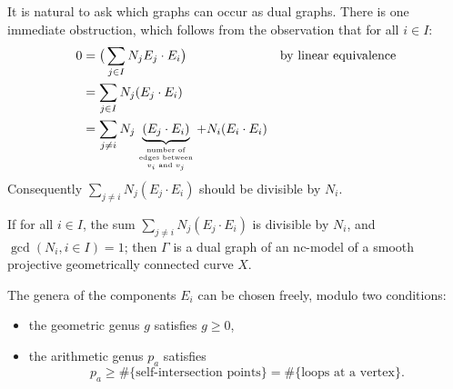 It is natural to ask which graphs can occur as dual graphs. There is one
immediate obstruction, which follows from the observation that for all $i \in
I$:
\begin{align*}
	0 &= \big(\sum_{j \in I} N_{j}E_{j} \cdot E_{i}\big) &&\text{by linear equivalence} \\
	&= \sum_{j \in I} N_{j} (E_{j} \cdot E_{i}) \\
	&= \sum_{j \ne i} N_{j} \underbrace{(E_{j} \cdot E_{i})}_{\parbox{4.5em}{\tiny \centering number of edges between $v_{i}$ and $v_{j}$}} + N_{i}(E_{i} \cdot E_{i})
\end{align*}
Consequently $\sum_{j \ne i} N_{j} (E_{j} \cdot E_{i})$ should be divisible by $N_{i}$.
\begin{theorem}[Winters]
	If for all $i \in I$, the sum $\sum_{j \ne i} N_{j} (E_{j} \cdot
	E_{i})$ is divisible by $N_{i}$, and $\gcd(N_{i}, i \in I) = 1$; then
	$\Gamma$ is a dual graph of an nc-model of a smooth projective
	geometrically connected curve $X$.

	The genera of the components $E_i$ can be chosen freely, modulo two
	conditions:
	\begin{itemize}
		\item the geometric genus $g$ satisfies $g \geq 0$,
		\item the arithmetic genus $p_a$ satisfies
			\[
				p_a \geq \#\{\text{self-intersection points}\}
				= \#\{\text{loops at a vertex}\}.
			\]
	\end{itemize}
\end{theorem}
